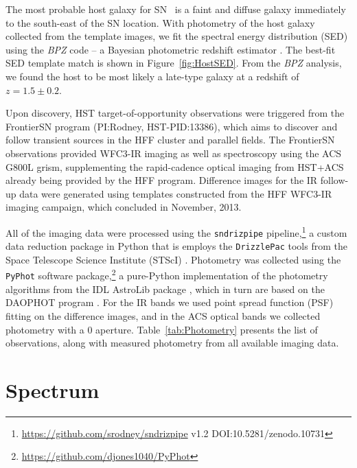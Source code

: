 The most probable host galaxy for SN \tomas\ is a faint and diffuse
galaxy immediately to the south-east of the SN location.  With
photometry of the host galaxy collected from the template images, we
fit the spectral energy distribution (SED) using the {\it BPZ} code --
a Bayesian photometric redshift estimator \citep{Benitez:2000}. The best-fit
SED template match is shown in Figure~\ref{fig:HostSED}.  From the
{\it BPZ} analysis, we found the host to be most likely a late-type
galaxy at a redshift of $z=1.5\pm0.2$.  

Upon discovery, HST target-of-opportunity
observations were triggered from the FrontierSN program (PI:Rodney,
HST-PID:13386), which aims to discover and follow transient sources in
the HFF cluster and parallel fields. The FrontierSN observations
provided WFC3-IR imaging as well as spectroscopy using the ACS G800L
grism, supplementing the rapid-cadence optical imaging from HST+ACS
already being provided by the HFF program. Difference images for the
IR follow-up data were generated using templates constructed from the
HFF WFC3-IR imaging campaign, which concluded in November, 2013.

All of the imaging data were processed using the {\tt sndrizpipe}
pipeline,\footnote{\url{https://github.com/srodney/sndrizpipe} v1.2
DOI:10.5281/zenodo.10731} a custom data reduction package in Python
that is employs the {\tt DrizzlePac} tools from the Space Telescope
Science Institute (STScI) \citep{Fruchter:2010}.  Photometry was
collected using the {\tt PyPhot} software
package,\footnote{\url{https://github.com/djones1040/PyPhot}} a
pure-Python implementation of the photometry algorithms from the IDL
AstroLib package \citep{Landsman:1993}, which in turn are based on the
DAOPHOT program \citep{Stetson:1987}.  For the IR bands we used point
spread function (PSF) fitting on the difference images, and in the ACS
optical bands we collected photometry with a
0 aperture. Table~\ref{tab:Photometry} presents the list of
observations, along with measured photometry from all available
imaging data.
 


\section{Spectrum}
\label{sec:Spectrum}

